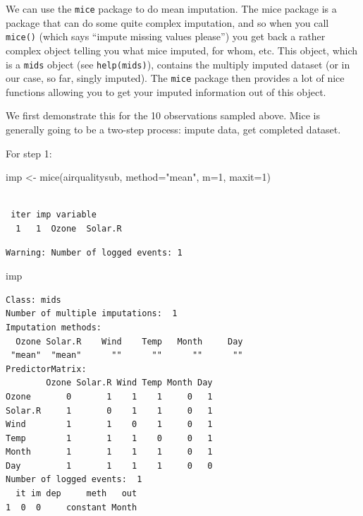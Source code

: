\documentclass[
  letterpaper,
  DIV=11,
  numbers=noendperiod]{scrreprt}
\newenvironment{Shaded}{}{}
\newcommand{\AttributeTok}[1]{\textcolor[rgb]{0.49,0.56,0.16}{#1}}
\newcommand{\DecValTok}[1]{\textcolor[rgb]{0.25,0.63,0.44}{#1}}
\newcommand{\FunctionTok}[1]{\textcolor[rgb]{0.02,0.16,0.49}{#1}}
\newcommand{\NormalTok}[1]{#1}
\newcommand{\OtherTok}[1]{\textcolor[rgb]{0.00,0.44,0.13}{#1}}
\newcommand{\StringTok}[1]{\textcolor[rgb]{0.25,0.44,0.63}{#1}}
\begin{document}
We can use the \texttt{mice} package to do mean imputation. The mice
package is a package that can do some quite complex imputation, and so
when you call \texttt{mice()} (which says ``impute missing values
please'') you get back a rather complex object telling you what mice
imputed, for whom, etc. This object, which is a \texttt{mids} object
(see \texttt{help(mids)}), contains the multiply imputed dataset (or in
our case, so far, singly imputed). The \texttt{mice} package then
provides a lot of nice functions allowing you to get your imputed
information out of this object.

We first demonstrate this for the 10 observations sampled above. Mice is
generally going to be a two-step process: impute data, get completed
dataset.

For step 1:

\begin{Shaded}
\begin{Highlighting}[]
\NormalTok{  imp }\OtherTok{\textless{}{-}} \FunctionTok{mice}\NormalTok{(airqualitysub, }\AttributeTok{method=}\StringTok{"mean"}\NormalTok{, }\AttributeTok{m=}\DecValTok{1}\NormalTok{, }\AttributeTok{maxit=}\DecValTok{1}\NormalTok{)}
\end{Highlighting}
\end{Shaded}

\begin{verbatim}

 iter imp variable
  1   1  Ozone  Solar.R
\end{verbatim}

\begin{verbatim}
Warning: Number of logged events: 1
\end{verbatim}

\begin{Shaded}
\begin{Highlighting}[]
\NormalTok{  imp}
\end{Highlighting}
\end{Shaded}

\begin{verbatim}
Class: mids
Number of multiple imputations:  1 
Imputation methods:
  Ozone Solar.R    Wind    Temp   Month     Day 
 "mean"  "mean"      ""      ""      ""      "" 
PredictorMatrix:
        Ozone Solar.R Wind Temp Month Day
Ozone       0       1    1    1     0   1
Solar.R     1       0    1    1     0   1
Wind        1       1    0    1     0   1
Temp        1       1    1    0     0   1
Month       1       1    1    1     0   1
Day         1       1    1    1     0   0
Number of logged events:  1 
  it im dep     meth   out
1  0  0     constant Month
\end{verbatim}
\end{document}
